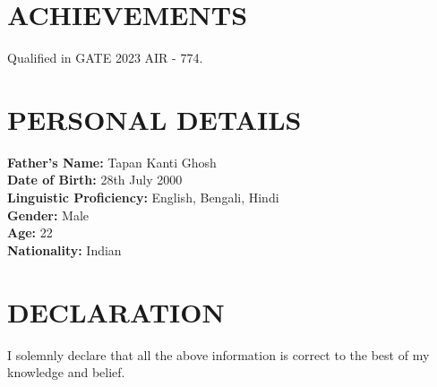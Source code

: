 \documentclass[a4paper,10pt]{article}
\begin{document}
\section{ACHIEVEMENTS}
Qualified in GATE 2023 AIR - 774.

\section{PERSONAL DETAILS}
\textbf{Father's Name:} Tapan Kanti Ghosh \\
\textbf{Date of Birth:} 28th July 2000 \\
\textbf{Linguistic Proficiency:} English, Bengali, Hindi \\
\textbf{Gender:} Male \\
\textbf{Age:} 22 \\
\textbf{Nationality:} Indian

\section{DECLARATION}
I solemnly declare that all the above information is correct to the best of my knowledge and belief.
\end{document}
